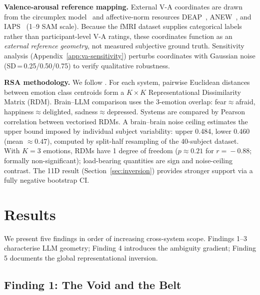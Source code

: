 \documentclass{article}
\begin{document}
\textbf{Valence-arousal reference mapping.}
External V-A coordinates are drawn from the circumplex model~\citep{russell1980,
mehrabian1974} and affective-norm resources DEAP~\citep{koelstra2012},
ANEW~\citep{bradley1999}, and IAPS~\citep{lang2008} (1--9 SAM scale).
Because the fMRI dataset supplies categorical labels rather than participant-level V-A
ratings, these coordinates function as an \emph{external reference geometry},
not measured subjective ground truth.
Sensitivity analysis (Appendix~\ref{app:va-sensitivity}) perturbs coordinates with
Gaussian noise (SD\,=\,0.25/0.50/0.75) to verify qualitative robustness.

\textbf{RSA methodology.}
We follow \citet{kriegeskorte2008}.
For each system, pairwise Euclidean distances between emotion class centroids form a
$K \times K$ Representational Dissimilarity Matrix (RDM).
Brain--LLM comparison uses the 3-emotion overlap: fear$\approx$afraid,
happiness$\approx$delighted, sadness$\approx$depressed.
Systems are compared by Pearson correlation between vectorised RDMs.
A brain--brain noise ceiling estimates the upper bound imposed by individual subject
variability: upper 0.484, lower 0.460 (mean $\approx\!0.47$), computed by split-half
resampling of the 40-subject dataset.
With $K\!=\!3$ emotions, RDMs have 1 degree of freedom ($p\!\approx\!0.21$ for $r\!=\!-0.88$;
formally non-significant); load-bearing quantities are sign and noise-ceiling contrast.
The 11D result (Section~\ref{sec:inversion}) provides stronger support via a fully
negative bootstrap CI.

\section{Results}

We present five findings in order of increasing cross-system scope.
Findings 1--3 characterise LLM geometry; Finding 4 introduces the ambiguity gradient;
Finding 5 documents the global representational inversion.

\subsection{Finding 1: The Void and the Belt}
\label{sec:finding1}
\end{document}
